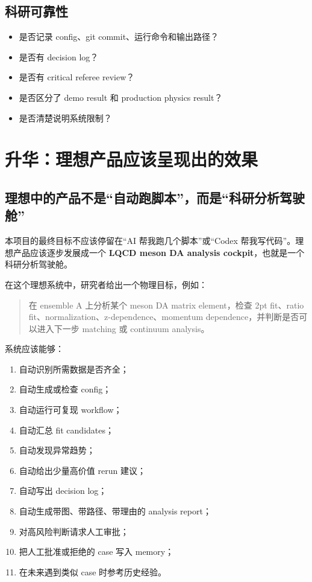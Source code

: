 \documentclass[11pt,a4paper,fontset=none]{ctexart}
\begin{document}
\subsection{科研可靠性}

\begin{itemize}[leftmargin=2em]
  \item 是否记录 config、git commit、运行命令和输出路径？
  \item 是否有 decision log？
  \item 是否有 critical referee review？
  \item 是否区分了 demo result 和 production physics result？
  \item 是否清楚说明系统限制？
\end{itemize}

\newpage

\section{升华：理想产品应该呈现出的效果}

\subsection{理想中的产品不是“自动跑脚本”，而是“科研分析驾驶舱”}

本项目的最终目标不应该停留在“AI 帮我跑几个脚本”或“Codex 帮我写代码”。理想产品应该逐步发展成一个 \textbf{LQCD meson DA analysis cockpit}，也就是一个科研分析驾驶舱。

在这个理想系统中，研究者给出一个物理目标，例如：

\begin{quote}
在 ensemble A 上分析某个 meson DA matrix element，检查 2pt fit、ratio fit、normalization、z-dependence、momentum dependence，并判断是否可以进入下一步 matching 或 continuum analysis。
\end{quote}

系统应该能够：

\begin{enumerate}[leftmargin=2em]
  \item 自动识别所需数据是否齐全；
  \item 自动生成或检查 config；
  \item 自动运行可复现 workflow；
  \item 自动汇总 fit candidates；
  \item 自动发现异常趋势；
  \item 自动给出少量高价值 rerun 建议；
  \item 自动写出 decision log；
  \item 自动生成带图、带路径、带理由的 analysis report；
  \item 对高风险判断请求人工审批；
  \item 把人工批准或拒绝的 case 写入 memory；
  \item 在未来遇到类似 case 时参考历史经验。
\end{enumerate}
\end{document}
